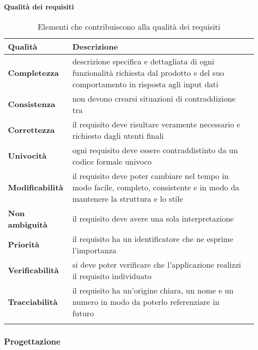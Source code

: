 \paragraph*{Qualità dei requisiti} 

\setlength{\freewidth}{\dimexpr\textwidth-0\tabcolsep}
	\renewcommand{\arraystretch}{1.5}
	\setlength{\aboverulesep}{0pt}
	\setlength{\belowrulesep}{0pt}
	\begin{longtable}{L{.15\freewidth} L{.6\freewidth} L{.080\freewidth}}
		\toprule 
		\textbf{Qualità} & \textbf{Descrizione} \\
		\toprule
		\endhead		
		\textbf{Completezza} &  descrizione specifica e dettagliata di ogni funzionalità richiesta dal prodotto  e del suo comportamento in risposta agli input dati\\
		\textbf{Consistenza} &  non devono crearsi situazioni di contraddizione tra \\
		\textbf{Correttezza} &  il requisito deve risultare veramente necessario e richiesto dagli utenti finali\\
		\textbf{Univocità} & ogni requisito deve essere contraddistinto da un codice formale univoco \\
		\textbf{Modificabilità} &  il requisito deve poter cambiare nel tempo in modo facile, completo, consistente e in modo da mantenere la struttura e lo stile\\
		\textbf{Non ambiguità} &  il requisito deve avere una sola interpretazione\\
		\textbf{Priorità} &  il requisito ha un identificatore che ne esprime l'importanza\\
		\textbf{Verificabilità} &  si deve poter verificare che l'applicazione realizzi il requisito individuato\\
		\textbf{Tracciabilità} &  il requisito ha un'origine chiara, un nome e un numero in modo da poterlo referenziare in futuro\\
		\bottomrule
		\hiderowcolors
		\caption{Elementi che contribuiscono alla qualità dei requisiti}
	\end{longtable}

\subsubsection{Progettazione}

